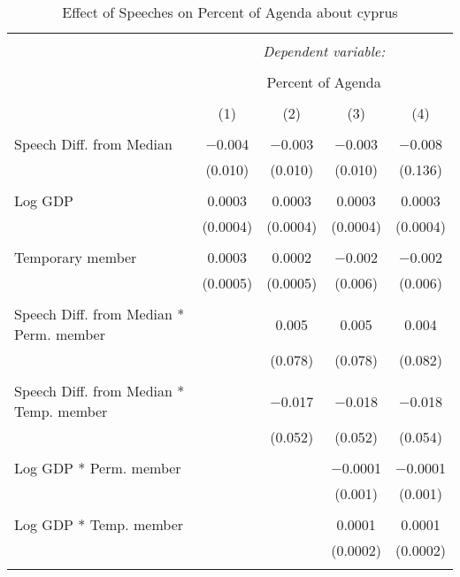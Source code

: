 
\begin{table}[!htbp] \centering 
  \caption{Effect of Speeches on Percent of Agenda about  cyprus} 
  \label{} 
\begin{tabular}{@{\extracolsep{5pt}}lcccc} 
\\[-1.8ex]\hline 
\hline \\[-1.8ex] 
 & \multicolumn{4}{c}{\textit{Dependent variable:}} \\ 
\cline{2-5} 
\\[-1.8ex] & \multicolumn{4}{c}{Percent of Agenda} \\ 
\\[-1.8ex] & (1) & (2) & (3) & (4)\\ 
\hline \\[-1.8ex] 
 Speech Diff. from Median & $-$0.004 & $-$0.003 & $-$0.003 & $-$0.008 \\ 
  & (0.010) & (0.010) & (0.010) & (0.136) \\ 
  & & & & \\ 
 Log GDP & 0.0003 & 0.0003 & 0.0003 & 0.0003 \\ 
  & (0.0004) & (0.0004) & (0.0004) & (0.0004) \\ 
  & & & & \\ 
 Temporary member & 0.0003 & 0.0002 & $-$0.002 & $-$0.002 \\ 
  & (0.0005) & (0.0005) & (0.006) & (0.006) \\ 
  & & & & \\ 
 Speech Diff. from Median * Perm. member &  & 0.005 & 0.005 & 0.004 \\ 
  &  & (0.078) & (0.078) & (0.082) \\ 
  & & & & \\ 
 Speech Diff. from Median * Temp. member &  & $-$0.017 & $-$0.018 & $-$0.018 \\ 
  &  & (0.052) & (0.052) & (0.054) \\ 
  & & & & \\ 
 Log GDP * Perm. member &  &  & $-$0.0001 & $-$0.0001 \\ 
  &  &  & (0.001) & (0.001) \\ 
  & & & & \\ 
 Log GDP * Temp. member &  &  & 0.0001 & 0.0001 \\ 
  &  &  & (0.0002) & (0.0002) \\ 
  & & & & \\ 

\end{tabular}
\end{table}
